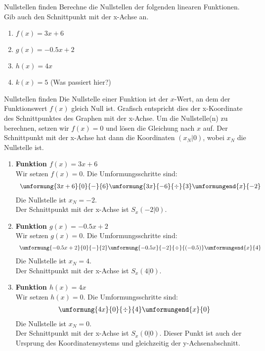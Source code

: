 \begin{aufgabenumgebung}{Nullstellen finden}
Berechne die Nullstellen der folgenden linearen Funktionen. Gib auch den Schnittpunkt mit der x-Achse an.
\begin{enumerate}
    \item $f(x) = 3x + 6$
    \item $g(x) = -0.5x + 2$
    \item $h(x) = 4x$
    \item $k(x) = 5$ (Was passiert hier?)
\end{enumerate}
\end{aufgabenumgebung}

\begin{loesungsumgebung}{Nullstellen finden}
Die Nullstelle einer Funktion ist der $x$-Wert, an dem der Funktionswert $f(x)$ gleich Null ist. Grafisch entspricht dies der x-Koordinate des Schnittpunktes des Graphen mit der x-Achse. Um die Nullstelle(n) zu berechnen, setzen wir $f(x)=0$ und lösen die Gleichung nach $x$ auf. Der Schnittpunkt mit der x-Achse hat dann die Koordinaten $(x_N|0)$, wobei $x_N$ die Nullstelle ist.

\begin{enumerate}
    \item \textbf{Funktion $f(x) = 3x + 6$} \\
    Wir setzen $f(x)=0$. Die Umformungsschritte sind:
    $$
    \begin{array}{r c l c l}
    \umformung{3x+6}{0}{-}{6}
    \umformung{3x}{-6}{\div}{3}
    \umformungend{x}{-2}
    \end{array}
    $$
    Die Nullstelle ist $x_N = -2$. \\
    Der Schnittpunkt mit der x-Achse ist $S_x(-2|0)$.

    \item \textbf{Funktion $g(x) = -0.5x + 2$} \\
    Wir setzen $g(x)=0$. Die Umformungsschritte sind:
    $$
    \begin{array}{r c l c l}
    \umformung{-0.5x + 2}{0}{-}{2}
    \umformung{-0.5x}{-2}{\div}{(-0.5)}
    \umformungend{x}{4}
    \end{array}
    $$
    Die Nullstelle ist $x_N = 4$. \\
    Der Schnittpunkt mit der x-Achse ist $S_x(4|0)$.

    \item \textbf{Funktion $h(x) = 4x$} \\
    Wir setzen $h(x)=0$. Die Umformungsschritte sind:
    $$
    \begin{array}{r c l c l}
    \umformung{4x}{0}{\div}{4}
    \umformungend{x}{0}
    \end{array}
    $$
    Die Nullstelle ist $x_N = 0$. \\
    Der Schnittpunkt mit der x-Achse ist $S_x(0|0)$. Dieser Punkt ist auch der Ursprung des Koordinatensystems und gleichzeitig der y-Achsenabschnitt.


\end{enumerate}
\end{loesungsumgebung}
